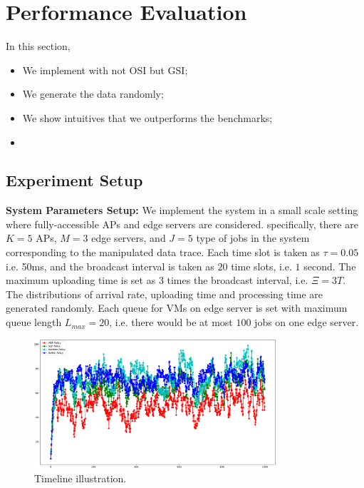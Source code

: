 \section{Performance Evaluation}
\label{sec:evaluation}
In this section, 
\begin{itemize}
    \item We implement with not OSI but GSI;
    \item We generate the data randomly;
    \item We show intuitives that we outperforms the benchmarks;
    \item 
\end{itemize}

\subsection{Experiment Setup}
\textbf{System Parameters Setup:}
We implement the system in a small scale setting where fully-accessible APs and edge servers are considered.
specifically, there are $K=5$ APs, $M=3$ edge servers, and $J=5$ type of jobs in the system corresponding to the manipulated data trace.
Each time slot is taken as $\tau = 0.05$ i.e. 50ms, and the broadcast interval is taken as $20$ time slots, i.e. $1$ second.
The maximum uploading time is set as $3$ times the broadcast interval, i.e. $\Xi = 3T$.
The distributions of arrival rate, uploading time and processing time are generated randomly.
Each queue for VMs on edge server is set with maximum queue length $L_{max}=20$, i.e. there would be at most $100$ jobs on one edge server.

\begin{figure}[ht!]
    \centering
    \includegraphics[width=0.80\textwidth]{images/Figure_1.pdf}
    \caption{Timeline illustration.}
    \label{fig:general_timeline}
\end{figure}

